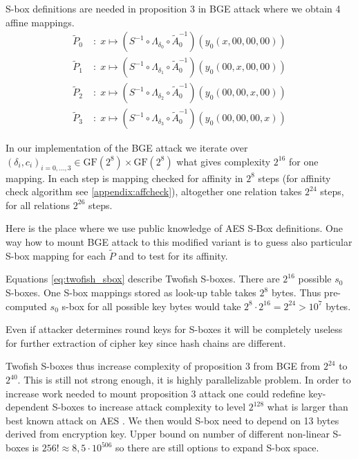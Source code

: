 \documentclass[11pt,oneside,final]{fithesis2}
\newcommand{\gfe}{\ensuremath{\text{GF}\left(2^8\right)}}
\begin{document}
    S-box definitions are needed in proposition 3 in BGE attack where we obtain 4 affine mappings.
    \begin{subequations}\label{eq:BGE_prop3}
    \begin{align}
	\widetilde{P}_0 \;&: \; x \mapsto \left( S^{-1} \circ \Lambda_{\delta_0} \circ \widetilde{A}_0^{-1}\right) \left( y_0\left(x, 00, 00, 00\right) \right)\\
	\widetilde{P}_1 \;&: \; x \mapsto \left( S^{-1} \circ \Lambda_{\delta_1} \circ \widetilde{A}_0^{-1}\right) \left( y_0\left(00, x, 00, 00\right) \right)\\
	\widetilde{P}_2 \;&: \; x \mapsto \left( S^{-1} \circ \Lambda_{\delta_2} \circ \widetilde{A}_0^{-1}\right) \left( y_0\left(00, 00, x, 00\right) \right)\\
	\widetilde{P}_3 \;&: \; x \mapsto \left( S^{-1} \circ \Lambda_{\delta_3} \circ \widetilde{A}_0^{-1}\right) \left( y_0\left(00, 00, 00, x\right) \right)
    \end{align}
    \end{subequations}
    
    In our implementation of the BGE attack we iterate over $\left(\delta_i, c_i\right)_{i=0,\dots,3} \in \gfe \times \gfe$ what gives complexity $2^{16}$ for one mapping.
    In each step is mapping checked for affinity in $2^8$ steps (for affinity check algorithm see \ref{appendix:affcheck}), altogether one relation takes $2^{24}$ steps, for all relations
    $2^{26}$ steps.
    
    Here is the place where we use public knowledge of AES S-Box definitions. One way how to mount BGE attack to this modified variant is to guess also particular S-box
    mapping for each $\widetilde{P}$ and to test for its affinity. 
    
    Equations \ref{eq:twofish_sbox} describe Twofish S-boxes. There are $2^{16}$ possible $s_0$ S-boxes. One S-box mappings stored as look-up table takes $2^8$ bytes.
    Thus pre-computed $s_0$ s-box for all possible key bytes would take $2^8 \cdot 2^{16} = 2^{24} > 10^7$ bytes. 
    
    Even if attacker determines round keys for S-boxes it will be completely useless for further extraction of cipher key since hash chains are different. 
    
    Twofish S-boxes thus increase complexity of proposition 3 from BGE from $2^{24}$ to $2^{40}$. This is still not strong enough, it is highly parallelizable problem.
    In order to increase work needed to mount proposition 3 attack one could redefine key-dependent S-boxes to increase attack complexity to level $2^{128}$ what is larger
    than best known attack on AES \citep{cryptoeprint:2011:449}. We then would S-box need to depend on 13 bytes derived from encryption key. Upper bound on number of different non-linear S-boxes is $256! \approx 8,5\cdot 10^{506}$ so there are still options to expand 
    S-box space. 
    
\end{document}
